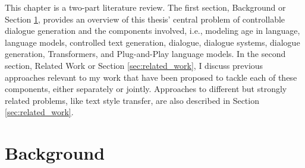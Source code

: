 
This chapter is a two-part literature review. The first section, Background or Section \ref{sec:background}, provides an overview of this thesis' central problem of controllable dialogue generation and the components involved, i.e., 
modeling age in language, language models, controlled text generation, dialogue, dialogue systems, dialogue generation, Transformers, and Plug-and-Play language models. 
In the second section, Related Work or Section \ref{sec:related_work}, I discuss previous approaches relevant to my work that have been proposed to tackle each of these components, either separately or jointly. Approaches to different but strongly related problems, like text style transfer, are also described in Section \ref{sec:related_work}.

\section{Background}
\label{sec:background}



